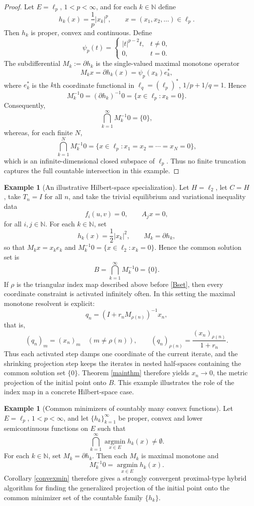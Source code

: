 \documentclass[leqno,12pt]{amsart}
\theoremstyle{definition}
\newtheorem{example}[theorem]{Example}
\numberwithin{equation}{section}
\begin{document}
\begin{proof}
Let $E=\ell_p$, $1<p<\infty$, and for each $k\in\mathbb N$ define
\[
h_k(x)=\frac{1}{p}|x_k|^p,\qquad x=(x_1,x_2,\ldots)\in\ell_p.
\]
Then $h_k$ is proper, convex and continuous. Define
\[
\psi_p(t)=
\begin{cases}
|t|^{p-2}t, & t\neq 0,\\
0, & t=0.
\end{cases}
\]
The subdifferential $M_k:=\partial h_k$ is the single-valued maximal monotone operator
\[
M_kx=\partial h_k(x)=\psi_p(x_k)e_k^{*},
\]
where $e_k^{*}$ is the $k$th coordinate functional in $\ell_q=(\ell_p)^{*}$, $1/p+1/q=1$. Hence
\[
M_k^{-1}0=(\partial h_k)^{-1}0=\{x\in\ell_p:x_k=0\}.
\]
Consequently,
\[
\bigcap_{k=1}^{\infty}M_k^{-1}0=\{0\},
\]
whereas, for each finite $N$,
\[
\bigcap_{k=1}^{N}M_k^{-1}0
=\{x\in\ell_p:x_1=x_2=\cdots=x_N=0\},
\]
which is an infinite-dimensional closed subspace of $\ell_p$. Thus no finite truncation captures the full countable intersection in this example.
\end{proof}

\begin{example}[An illustrative Hilbert-space specialization]\label{hilbert-illustrative-example}
Let $H=\ell_2$, let $C=H$, take $T_n=I$ for all $n$, and take the trivial equilibrium and variational inequality data
\[
f_i(u,v)=0,\qquad A_jx=0,
\]
for all $i,j\in\mathbb N$. For each $k\in\mathbb N$, set
\[
h_k(x)=\frac12 |x_k|^2,\qquad M_k=\partial h_k,
\]
so that $M_kx=x_ke_k$ and $M_k^{-1}0=\{x\in\ell_2:x_k=0\}$. Hence the common solution set is
\[
B=\bigcap_{k=1}^{\infty}M_k^{-1}0=\{0\}.
\]
If $\rho$ is the triangular index map described above before \eqref{Bset}, then every coordinate constraint is activated infinitely often. In this setting the maximal monotone resolvent is explicit:
\[
q_n=(I+r_nM_{\rho(n)})^{-1}x_n,
\]
that is,
\[
(q_n)_m=(x_n)_m \quad (m\neq \rho(n)),\qquad
(q_n)_{\rho(n)}=\frac{(x_n)_{\rho(n)}}{1+r_n}.
\]
Thus each activated step damps one coordinate of the current iterate, and the shrinking projection step keeps the iterates in nested half-spaces containing the common solution set $\{0\}$. Theorem \ref{mainthm} therefore yields $x_n\to 0$, the metric projection of the initial point onto $B$. This example illustrates the role of the index map in a concrete Hilbert-space case.
\end{example}

\begin{example}[Common minimizers of countably many convex functions]
Let $E=\ell_p$, $1<p<\infty$, and let $\{h_k\}_{k=1}^{\infty}$ be proper, convex and lower semicontinuous functions on $E$ such that
\[
\bigcap_{k=1}^{\infty}\operatorname*{argmin}_{x\in E}h_k(x)\neq\emptyset.
\]
For each $k\in\mathbb N$, set $M_k=\partial h_k$. Then each $M_k$ is maximal monotone and
\[
M_k^{-1}0=\operatorname*{argmin}_{x\in E}h_k(x).
\]
Corollary \ref{convexmin} therefore gives a strongly convergent proximal-type hybrid algorithm for finding the generalized projection of the initial point onto the common minimizer set of the countable family $\{h_k\}$.
\end{example}
\end{document}
